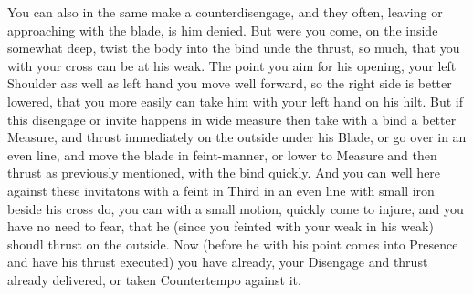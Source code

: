 You can also in the same make a counterdisengage, and they often,
leaving or approaching with the blade, is him denied. But were you
come, on the inside somewhat deep, twist the body into the bind unde
the thrust, so much, that you with your cross can be at his weak. The
point you aim for his opening, your left Shoulder ass well as left
hand you move well forward, so the right side is better lowered, that
you more easily can take him with your left hand on his hilt.
But if this disengage or invite  happens in wide measure then take with
a bind a better Measure, and thrust immediately on the outside under
his Blade, or go over in an even line, and move the blade in
feint-manner, or lower to Measure and then thrust as previously
mentioned, with the bind quickly. And you can well here against these
invitatons with a feint in Third in an even line with small iron beside
his cross do, you can with a small motion, quickly come to
injure, and you have no need to fear, that he (since you feinted with
your weak in his weak) shoudl thrust on the outside. Now (before he
with his point comes into Presence and have his thrust executed) you
have already, your Disengage and thrust already delivered, or taken
Countertempo against it.
